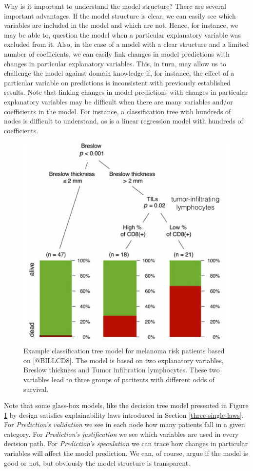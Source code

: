 \documentclass[12pt,]{krantz}
\begin{document}
Why is it important to understand the model structure? There are several important advantages. If the model structure is clear, we can easily see which variables are included in the model and which are not. Hence, for instance, we may be able to, question the model when a particular explanatory variable was excluded from it. Also, in the case of a model with a clear structure and a limited number of coefficients, we can easily link changes in model predictions with changes in particular explanatory variables. This, in turn, may allow us to challenge the model against domain knowledge if, for instance, the effect of a particular variable on predictions is inconsistent with previously established results. Note that linking changes in model predictions with changes in particular explanatory variables may be difficult when there are many variables and/or coefficients in the model. For instance, a classification tree with hundreds of nodes is difficult to understand, as is a linear regression model with hundreds of coefficients.

\begin{figure}

{\centering \includegraphics[width=0.5\linewidth]{figure/wbBILL8model} 

}

\caption{Example classification tree model for melanoma risk patients based on [@BILLCD8]. The model is based on two explanatory variables, Breslow thickness and Tumor infiltration lymphocytes. These two variables lead to three groups of paritents with different odds of survival.}\label{fig:BILLCD8}
\end{figure}

Note that some glass-box models, like the decision tree model presented in Figure \ref{fig:BILLCD8} by design satisfies explainability laws introduced in Section \ref{three-single-laws}.
For \emph{Prediction's validation} we see in each node how many patients fall in a given category. For \emph{Prediction's justification} we see which variables are used in every decision path. For \emph{Prediction's speculation} we can trace how changes in particular variables will affect the model prediction. We can, of course, argue if the model is good or not, but obviously the model structure is transparent.
\end{document}
